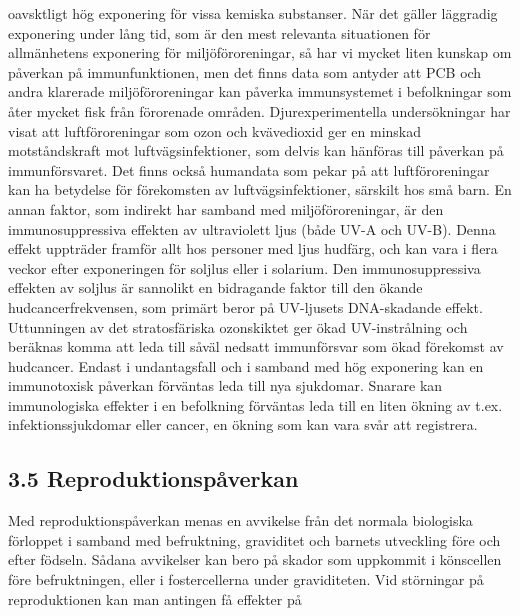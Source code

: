 oavsktligt hög exponering för vissa kemiska substanser. När det gäller läggradig exponering under lång tid, som är den mest relevanta situationen för allmänhetens exponering för miljöföroreningar, så har vi mycket liten kunskap om påverkan på immunfunktionen, men det finns data som antyder att PCB och andra klarerade miljöföroreningar kan påverka immunsystemet i befolkningar som åter mycket fisk från förorenade områden.
Djurexperimentella undersökningar har visat att luftföroreningar som ozon och kvävedioxid ger en minskad motståndskraft mot luftvägsinfektioner, som delvis kan hänföras till påverkan på immunförsvaret. Det finns också humandata som pekar på att luftföroreningar kan ha betydelse för förekomsten av luftvägsinfektioner, särskilt hos små barn.
En annan faktor, som indirekt har samband med miljöföroreningar, är den immunosuppressiva effekten av ultraviolett ljus (både UV-A och UV-B). Denna effekt uppträder framför allt hos personer med ljus hudfärg, och kan vara i flera veckor efter exponeringen för soljlus eller i solarium. Den immunosuppressiva effekten av soljlus är sannolikt en bidragande faktor till den ökande hudcancerfrekvensen, som primärt beror på UV-ljusets DNA-skadande effekt. Uttunningen av det stratosfäriska ozonskiktet ger ökad UV-instrålning och beräknas komma att leda till såväl nedsatt immunförsvar som ökad förekomst av hudcancer.
Endast i undantagsfall och i samband med hög exponering kan en immunotoxisk påverkan förväntas leda till nya sjukdomar. Snarare kan immunologiska effekter i en befolkning förväntas leda till en liten ökning av t.ex. infektionssjukdomar eller cancer, en ökning som kan vara svår att registrera.
\subsection*{3.5 Reproduktionspåverkan}
Med reproduktionspåverkan menas en avvikelse från det normala biologiska förloppet i samband med befruktning, graviditet och barnets utveckling före och efter födseln. Sådana avvikelser kan bero på skador som uppkommit i könscellen före befruktningen, eller i fostercellerna under graviditeten. Vid störningar på reproduktionen kan man antingen få effekter på

